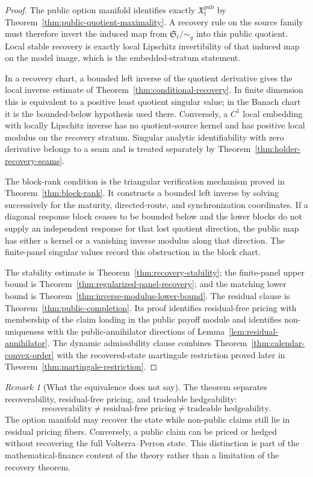 \documentclass[11pt,a4paper]{amsart}
\theoremstyle{plain}
\theoremstyle{definition}
\theoremstyle{remark}
\newtheorem{remark}[theorem]{Remark}
\begin{document}
\begin{proof}
The public option manifold identifies exactly \(\mathfrak X_t^{\mathrm{pub}}\) by
Theorem~\ref{thm:public-quotient-maximality}.  A recovery rule on the source family must therefore
invert the induced map from \(\mathfrak S_t/\!\sim_g\) into this public quotient.  Local stable
recovery is exactly local Lipschitz invertibility of that induced map on the model image, which
is the embedded-stratum statement.

In a recovery chart, a bounded left inverse of the quotient derivative gives the local inverse
estimate of Theorem~\ref{thm:conditional-recovery}.  In finite dimension this is equivalent to a
positive least quotient singular value; in the Banach chart it is the bounded-below hypothesis used
there.  Conversely, a \(C^1\) local embedding with locally Lipschitz inverse has no quotient-source
kernel and has positive local modulus on the recovery stratum.  Singular analytic identifiability
with zero derivative belongs to a seam and is treated separately by
Theorem~\ref{thm:holder-recovery-seams}.

The block-rank condition is the triangular verification mechanism proved in
Theorem~\ref{thm:block-rank}.  It constructs a bounded left inverse by solving successively for the
maturity, directed-route, and synchronization coordinates.  If a diagonal response block ceases to
be bounded below and the lower blocks do not supply an independent response for that lost quotient
direction, the public map has either a kernel or a vanishing inverse modulus along that direction.
The finite-panel singular values record this obstruction in the block chart.

The stability estimate is Theorem~\ref{thm:recovery-stability}; the finite-panel upper bound is
Theorem~\ref{thm:regularized-panel-recovery}; and the matching lower bound is
Theorem~\ref{thm:inverse-modulus-lower-bound}.  The residual clause is
Theorem~\ref{thm:public-completion}.  Its proof identifies residual-free pricing with membership
of the claim loading in the public payoff module and identifies non-uniqueness with the
public-annihilator directions of Lemma~\ref{lem:residual-annihilator}.  The dynamic admissibility
clause combines Theorem~\ref{thm:calendar-convex-order} with the recovered-state martingale
restriction proved later in Theorem~\ref{thm:martingale-restriction}.
\end{proof}

\begin{remark}[What the equivalence does not say]
The theorem separates recoverability, residual-free pricing, and tradeable hedgeability:
\[
        \text{recoverability}\ne\text{residual-free pricing}\ne\text{tradeable hedgeability}.
\]
The option manifold may recover the state while non-public claims still lie in residual pricing
fibers.  Conversely, a public claim can be priced or hedged without recovering the full
Volterra--Perron state.  This distinction is part of the mathematical-finance content of the
theory rather than a limitation of the recovery theorem.
\end{remark}
\end{document}
